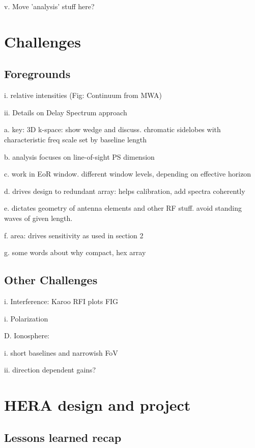 \documentclass[preprint]{aastex}
\begin{document}
v. Move 'analysis' stuff here?


\section{Challenges} %

\subsection{Foregrounds}  %

i. relative intensities (Fig: Continuum from MWA)

ii. Details on Delay Spectrum approach

a. key: 3D k-space: show wedge and discuss. chromatic sidelobes with characteristic freq scale 
set by baseline length

b. analysis focuses on line-of-sight PS dimension

c. work in EoR window.  different window levels, depending on effective horizon

d. drives design to redundant array: helps calibration, add spectra coherently

e. dictates geometry of antenna elements and other RF stuff. avoid standing waves of given length. 

f. area: drives sensitivity as used in section 2

g. some words about why compact, hex array 

\subsection{Other Challenges} %

i. Interference: Karoo RFI plots  FIG 

i. Polarization 

D. Ionosphere: 

i. short baselines and narrowish FoV

ii. direction dependent gains?


\section{HERA design and project} %

\subsection{Lessons learned recap} %
\end{document}
